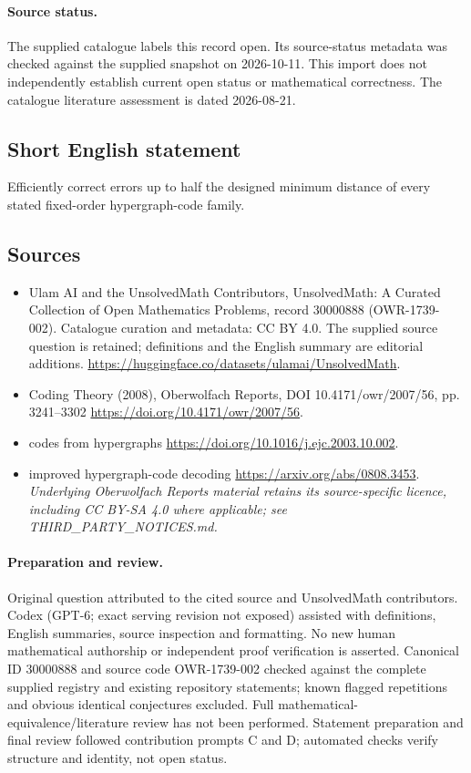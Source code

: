 \documentclass[11pt]{article}
\begin{document}
\paragraph{Source status.}
The supplied catalogue labels this record open. Its source-status metadata was checked against the supplied snapshot on 2026-10-11. This import does not independently establish current open status or mathematical correctness. The catalogue literature assessment is dated 2026-08-21.
\subsection{Short English statement}
Efficiently correct errors up to half the designed minimum distance of every stated fixed-order hypergraph-code family.
\subsection{Sources}
\begin{itemize}
\item[\hypertarget{source:30000888:1}{S1}] Ulam AI and the UnsolvedMath Contributors, UnsolvedMath: A Curated Collection of Open Mathematics Problems, record 30000888 (OWR-1739-002). Catalogue curation and metadata: CC BY 4.0. The supplied source question is retained; definitions and the English summary are editorial additions.
\url{https://huggingface.co/datasets/ulamai/UnsolvedMath}.
\item[\hypertarget{source:30000888:2}{S2}] Coding Theory (2008), Oberwolfach Reports, DOI 10.4171/owr/2007/56, pp. 3241--3302
\url{https://doi.org/10.4171/owr/2007/56}.
\item[\hypertarget{source:30000888:3}{S3}] codes from hypergraphs
\url{https://doi.org/10.1016/j.ejc.2003.10.002}.
\item[\hypertarget{source:30000888:4}{S4}] improved hypergraph-code decoding
\url{https://arxiv.org/abs/0808.3453}.
\textit{Underlying Oberwolfach Reports material retains its source-specific licence, including CC BY-SA 4.0 where applicable; see THIRD\_PARTY\_NOTICES.md.}
\end{itemize}
\paragraph{Preparation and review.}
Original question attributed to the cited source and UnsolvedMath contributors. Codex (GPT-6; exact serving revision not exposed) assisted with definitions, English summaries, source inspection and formatting. No new human mathematical authorship or independent proof verification is asserted. Canonical ID 30000888 and source code OWR-1739-002 checked against the complete supplied registry and existing repository statements; known flagged repetitions and obvious identical conjectures excluded. Full mathematical-equivalence/literature review has not been performed. Statement preparation and final review followed contribution prompts C and D; automated checks verify structure and identity, not open status.
\label{end:30000888}
\end{document}
